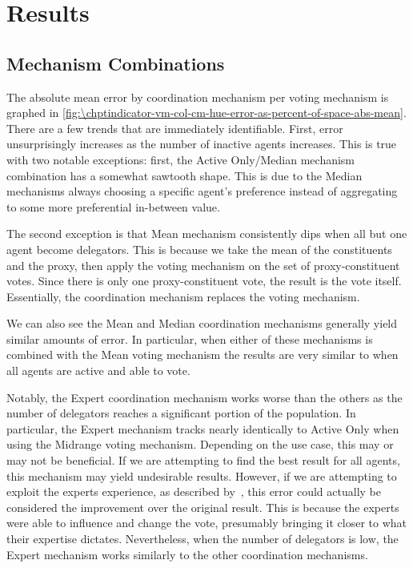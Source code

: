 \section{Results}\label{sec:\chptindicator-results}

\subsection{Mechanism Combinations}\label{subsec:\chptindicator-mechanism-combinations}
The absolute mean error by coordination mechanism per voting mechanism is graphed in
\autoref{fig:\chptindicator-vm-col-cm-hue-error-as-percent-of-space-abs-mean}.
There are a few trends that are immediately identifiable.
First, error unsurprisingly increases as the number of inactive agents increases.
This is true with two notable exceptions: first, the Active Only/Median
mechanism combination has a somewhat sawtooth shape.
This is due to the Median mechanisms always choosing a specific agent's preference
instead of aggregating to some more preferential in-between value.

The second exception is that Mean mechanism consistently dips when all but one agent
become delegators.
This is because we take the mean of the constituents and the proxy, then apply the
voting mechanism on the set of proxy-constituent votes.
Since there is only one proxy-constituent vote, the result is the vote itself.
Essentially, the coordination mechanism replaces the voting mechanism.

We can also see the Mean and Median coordination mechanisms generally yield similar
amounts of error.
In particular, when either of these mechanisms is combined with the Mean voting
mechanism the results are very similar to when all agents are active and able to vote.

Notably, the Expert coordination mechanism works worse than the others as the number
of delegators reaches a significant portion of the population.
In particular, the Expert mechanism tracks nearly identically to Active Only when
using the Midrange voting mechanism.
Depending on the use case, this may or may not be beneficial.
If we are attempting to find the best result for all agents, this mechanism may yield
undesirable results.
However, if we are attempting to exploit the experts experience, as described
by~\cite{Miller1969}, this error could actually be considered the improvement over
the original result.
This is because the experts were able to influence and change the vote, presumably
bringing it closer to what their expertise dictates.
Nevertheless, when the number of delegators is low, the Expert mechanism works
similarly to the other coordination mechanisms.

